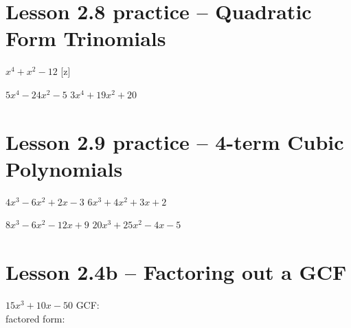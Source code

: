 \documentclass[12pt,letterpaper]{memoir}
\begin{document}
\pagestyle{plain}
\checkandfixthelayout
\raggedbottom


\noindent
{}


\section*{Lesson 2.8 practice -- Quadratic Form Trinomials}
%
%
{
    $ x^4 + x^2 - 12 $ 
    \tcblower 
    [z]
}


\myProblemsWithContent
{
    $ 5x^4 - 24x^2 - 5 $ 
    \tcblower 
}
{
    $ 3x^4 + 19x^2 + 20 $ 
    \tcblower 
}

%
%

\section*{Lesson 2.9 practice -- 4-term Cubic Polynomials}

\myProblemsWithContent%
{
    $ 4x^3 - 6x^2 + 2x - 3 $ 
    \tcblower 
}
{
    $ 6x^3 + 4x^2 + 3x + 2 $ 
    \tcblower 
}


\myProblemsWithContent
{
    $ 8x^3 - 6x^2 - 12x + 9 $ 
    \tcblower 
}
{
    $ 20x^3 + 25x^2 - 4x - 5 $ 
    \tcblower 
}

%
%

\section*{Lesson 2.4b -- Factoring out a GCF}

{
    $15x^3 + 10x - 50$
    \tcblower
    \vspace{1.5in}
    GCF: \\
    factored form: 
        ~%
}
\end{document}

